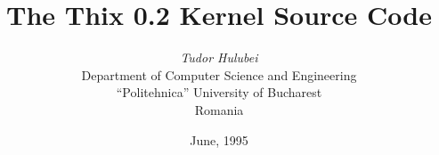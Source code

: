 
\setlength{\parindent}{0pt}

\def\a#1{
        {\bf #1}
}

\title{\bf The Thix 0.2 Kernel Source Code}

\author{{\em Tudor Hulubei}\\
        Department of Computer Science and Engineering\\
        ``Politehnica'' University of Bucharest\\
        Romania}

\date{June, 1995}


\maketitle

